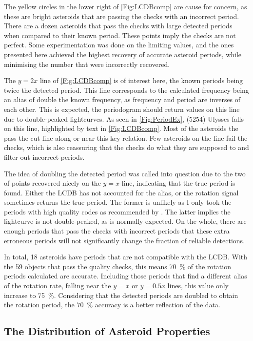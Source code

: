 \documentclass{UCreport}
\begin{document}
The yellow circles in the lower right of \autoref{Fig:LCDBcomp} are cause for concern, as these are bright asteroids that are passing the checks with an incorrect period.
There are a dozen asteroids that pass the checks with large detected periods when compared to their known period.
These points imply the checks are not perfect.
Some experimentation was done on the limiting values, and the ones presented here achieved the highest recovery of accurate asteroid periods, while minimising the number that were incorrectly recovered.

The $y=2x$ line of \autoref{Fig:LCDBcomp} is of interest here, the known periods being twice the detected period.
This line corresponds to the calculated frequency being an alias of double the known frequency, as frequency and period are inverses of each other.
This is expected, the periodogram should return values on this line due to double-peaked lightcurves.
As seen in \autoref{Fig:PeriodEx}, (5254) Ulysses falls on this line, highlighted by text in \autoref{Fig:LCDBcomp}.
Most of the asteroids the pass the cut line along or near this key relation.
Few asteroids on the line fail the checks, which is also reassuring that the checks do what they are supposed to and filter out incorrect periods.

The idea of doubling the detected period was called into question due to the two of points recovered nicely on the $y=x$ line, indicating that the true period is found.
Either the LCDB has not accounted for the alias,  or the rotation signal sometimes returns the true period.
The former is unlikely as I only took the periods with high quality codes as recommended by \citet{Warner2009}.
The latter implies the lightcurve is not double-peaked, as is normally expected.
On the whole, there are enough periods that pass the checks with incorrect periods that these extra erroneous periods will not significantly change the fraction of reliable detections.

In total, 18 asteroids have periods that are not compatible with the LCDB.
With the 59 objects that pass the quality checks, this means \qty{70}{\percent} of the rotation periods calculated are accurate.
Including those periods that find a different alias of the rotation rate, falling near the $y=x$ or $y=0.5x$ lines, this value only increase to \qty{75}{\percent}. 
Considering that the detected periods are doubled to obtain the rotation period, the \qty{70}{\percent} accuracy is a better reflection of the data.  


\subsection{The Distribution of Asteroid Properties}\label{SubSec:AstPropRes}
\end{document}
